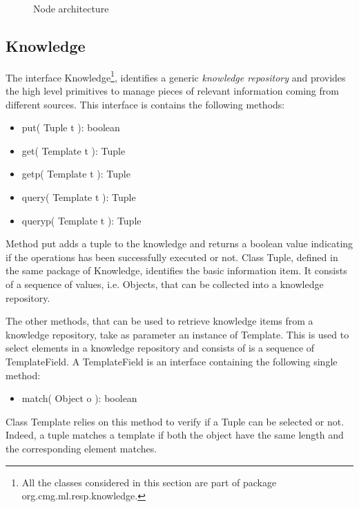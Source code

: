 \documentclass[11pt]{article}
\newcommand{\resppackage}[1]{\textsf{org.cmg.ml.resp.#1}}
\begin{document}
\begin{figure}[tp]
\begin{center}
    	\end{center}
	\caption{Node architecture}
	\label{fig:respnode}
\end{figure}

\subsection{Knowledge}
\label{sec:knowledge}

The interface \textsf{Knowledge}\footnote{All the classes considered in this section are part of package \resppackage{knowledge}.},
identifies a generic \emph{knowledge repository} and provides the high level primitives to 
manage pieces of relevant information coming from different sources. 
%
This interface is contains the following methods:
\begin{itemize}
\item \textsf{put( Tuple t ): boolean}
\item \textsf{get( Template t ): Tuple}
\item \textsf{getp( Template t ): Tuple}
\item \textsf{query( Template t ): Tuple}
\item \textsf{queryp( Template t ): Tuple}
\end{itemize}

Method \textsf{put} adds a tuple to the knowledge and returns a boolean value
indicating if the operations has been successfully executed or not. 
%
Class \textsf{Tuple}, defined in the same package of \textsf{Knowledge}, identifies the basic information item. It consists
of a sequence of values, i.e. \textsf{Objects}, that can be collected into a knowledge repository.

The other methods, that can be used to retrieve knowledge items from a knowledge repository, 
take as parameter an instance of \textsf{Template}. This is used to select elements in a knowledge repository
and consists of is a sequence of \textsf{TemplateField}. 
%
A \textsf{TemplateField} is an interface containing 
the following single method:
\begin{itemize}
\item \textsf{match( Object o ): boolean}
\end{itemize}
%
Class \textsf{Template} relies on this method to verify if a \textsf{Tuple} can be selected or not. Indeed, a tuple
matches a template if both the object have the same length and the corresponding element 
matches.
\end{document}
